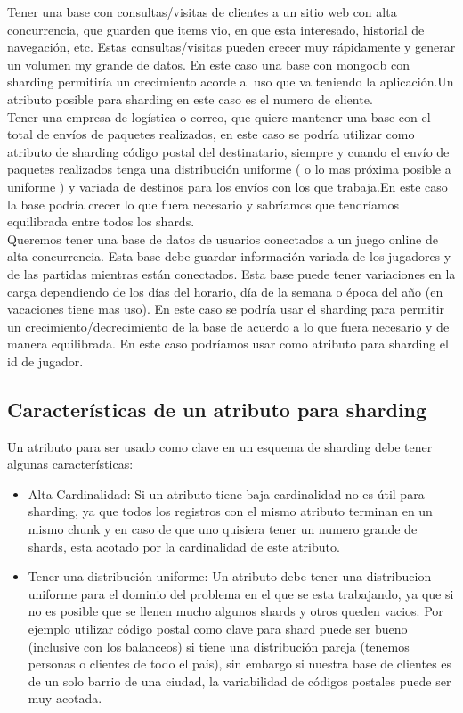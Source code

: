 Tener una base con consultas/visitas de clientes a un sitio web con alta concurrencia, que guarden que items vio, en que esta interesado, historial de navegación, etc. Estas consultas/visitas pueden crecer muy rápidamente y generar un volumen my grande de datos. En este caso una base con mongodb con sharding permitiría un crecimiento acorde al uso que va teniendo la aplicación.Un atributo posible para sharding en este caso es el numero de cliente.\\

Tener una empresa de logística o correo, que quiere mantener una base con el total de envíos de paquetes realizados, en este caso se podría utilizar como atributo de sharding código postal del destinatario, siempre y cuando el envío de paquetes realizados tenga una distribución uniforme ( o lo mas próxima posible a uniforme ) y variada de destinos para los envíos con los que trabaja.En este caso la base podría crecer lo que fuera necesario y sabríamos que tendríamos equilibrada entre todos los shards.\\

Queremos tener una base de datos de usuarios conectados a un juego online de alta concurrencia. Esta base debe guardar información variada de los jugadores y de las partidas mientras están conectados. Esta base puede tener variaciones en la carga dependiendo de los días del horario, día de la semana o época del año (en vacaciones tiene mas uso). En este caso se podría usar el sharding para permitir un crecimiento/decrecimiento de la base de acuerdo a lo que fuera necesario y de manera equilibrada. En este caso podríamos usar como atributo para sharding el id de jugador.\\


\subsection{Características de un atributo para sharding}
Un atributo para ser usado como clave en un esquema de sharding debe tener algunas características:\\

\begin{itemize}		
	\item Alta Cardinalidad: Si un atributo tiene baja cardinalidad no es útil para sharding, ya que todos los registros con el mismo atributo terminan en un mismo chunk y en caso de que uno quisiera tener un numero grande de shards, esta acotado por la cardinalidad de este atributo.
	\item Tener una distribución uniforme: Un atributo debe tener una distribucion uniforme para el dominio del problema en el que se esta trabajando, ya que si no es posible que se llenen mucho algunos shards y otros queden vacios. Por ejemplo utilizar código postal como clave para shard puede ser bueno (inclusive con los balanceos) si tiene una distribución pareja (tenemos personas o clientes de todo el país), sin embargo si nuestra base de clientes es de un solo barrio de una ciudad, la variabilidad de códigos postales puede ser muy acotada.
\end{itemize}
